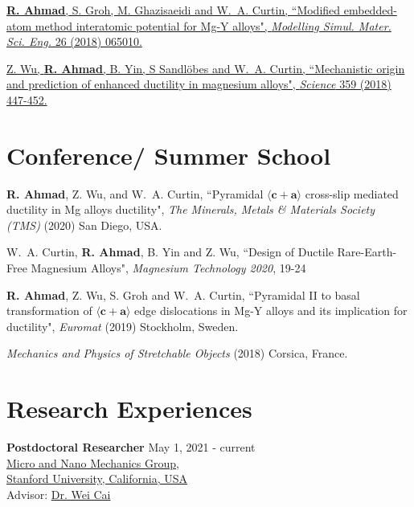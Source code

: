 \documentclass[margin,line]{resume}
\begin{document}
\begin{resume}
    \href{https://iopscience.iop.org/article/10.1088/1361-651X/aacfd2}{\textbf{R. Ahmad}, S. Groh, M. Ghazisaeidi and W.~A. Curtin, ``Modified embedded-atom method interatomic potential for Mg-Y alloys", \textit{Modelling Simul. Mater. Sci. Eng.} 26 (2018) 065010.}

    \href{https://science.sciencemag.org/content/359/6374/447.full} {Z. Wu, \textbf{R. Ahmad}, B. Yin, S Sandlöbes and W.~A. Curtin, ``Mechanistic origin and prediction of enhanced ductility in magnesium alloys", \textit{Science} 359 (2018) 447-452.}

    \section{\mysidestyle Conference/ Summer School}

    \textbf{R. Ahmad}, Z. Wu, and W.~A. Curtin, ``Pyramidal $\langle \boldsymbol{c} + \boldsymbol{a} \rangle$ cross-slip mediated ductility in Mg alloys ductility", \textit{The Minerals, Metals \& Materials Society (TMS)} (2020) San Diego, USA.

    W.~A. Curtin, \textbf{R. Ahmad}, B. Yin and Z. Wu, ``Design of Ductile Rare-Earth-Free Magnesium Alloys", \textit{Magnesium Technology 2020}, 19-24

    \textbf{R. Ahmad}, Z. Wu, S. Groh and W.~A. Curtin, ``Pyramidal II to basal transformation of $\langle
        \boldsymbol{c} + \boldsymbol{a} \rangle$ edge dislocations in Mg-Y alloys and its implication for
    ductility", \textit{Euromat} (2019) Stockholm, Sweden.

    \textit{Mechanics and Physics of Stretchable Objects} (2018) Corsica, France.

    \section{\mysidestyle Research Experiences}
    \textbf{\textsf{Postdoctoral Researcher}}    \hfill  \small{May 1, 2021 - current} \\
    \href{https://micronano.stanford.edu/}{Micro and Nano Mechanics Group}, \\
    \href{https://www.stanford.edu/}{Stanford University, California, USA}\\
    Advisor:  \href{https://web.stanford.edu/~caiwei/}{Dr. Wei Cai}


\end{resume}
\end{document}
